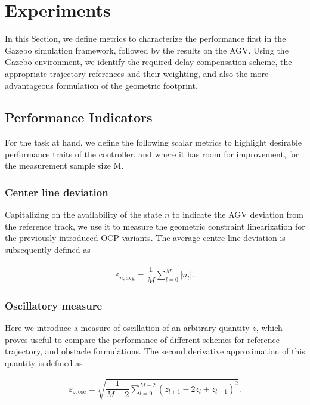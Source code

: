 \chapter{Experiments}\label{chap:experiments}
In this Section, we define metrics to characterize the performance first in the Gazebo simulation framework, followed by the results on the \ac{AGV}. Using the Gazebo environment, we identify the required delay compensation scheme, the appropriate trajectory references and their weighting, and also the more advantageous formulation of the geometric footprint.  

\section{Performance Indicators}\label{expr_KPI}
For the task at hand, we define the following scalar metrics to highlight desirable performance traits of the controller, and where it has room for improvement, for the measurement sample size M.

\subsection{Center line deviation}
Capitalizing on the availability of the state $n$ to indicate the \ac{AGV} deviation from the reference track, we use it to measure the geometric constraint linearization for the previously introduced \ac{OCP} variants. The average centre-line deviation is subsequently defined as

\begin{align}
    \varepsilon_{n,  \mathrm{avg}} = \dfrac{1}{M}\sum_{l=0}^{M} |n_{l}|.
\end{align}

\subsection{Oscillatory measure}
Here we introduce a measure of oscillation of an arbitrary quantity $z$, which proves useful to compare the performance of different schemes for reference trajectory, and obstacle formulations. 
The second derivative approximation of this quantity is defined as

\begin{align}
    \varepsilon_{z, \mathrm{osc}} = \sqrt{\dfrac{1}{M-2}\sum_{l=0}^{M-2} (z_{l+1} - 2z_{l} + z_{l-1})^2}.
\end{align}

